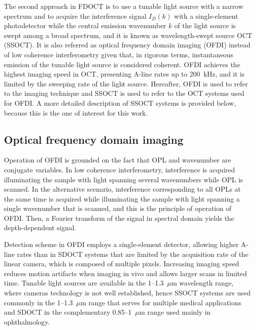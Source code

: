 The second approach in FDOCT is to use a tunable light source with a narrow spectrum and to acquire the interference signal $I_D(k)$ with a single-element photodetector while the central emission wavenumber $k$ of the light source is swept among a broad spectrum, and it is known as wavelength-swept source OCT (SSOCT). It is also referred as optical frequency domain imaging (OFDI) instead of low coherence interferometry given that, in rigorous terms, instantaneous emission of the tunable light source is considered coherent. OFDI achieves the highest imaging speed in OCT, presenting A-line rates up to 200~kHz, and it is limited by the sweeping rate of the light source. Hereafter, OFDI is used to refer to the imaging technique and SSOCT is used to refer to the OCT systems used for OFDI. A more detailed description of SSOCT systems is provided below, because this is the one of interest for this work.

\subsection{Optical frequency domain imaging}

Operation of OFDI is grounded on the fact that OPL and wavenumber are conjugate variables. In low coherence interferometry, interference is acquired illuminating the sample with light spanning several wavenumbers while OPL is scanned. In the alternative scenario, interference corresponding to all OPLs at the same time is acquired while illuminating the sample with light spanning a single wavenumber that is scanned, and this is the principle of operation of OFDI. Then, a Fourier transform of the signal in spectral domain yields the depth-dependent signal.

Detection scheme in OFDI employs a single-element detector, allowing higher A-line rates than in SDOCT systems that are limited by the acquisition rate of the linear camera, which is composed of multiple pixels. Increasing imaging speed reduces motion artifacts when imaging in vivo and allows larger scans in limited time. Tunable light sources are available in the 1--1.3~$\mu$m wavelength range, where cameras technology is not well established, hence SSOCT systems are used commonly in the 1--1.3~$\mu$m range that serves for multiple medical applications and SDOCT in the complementary 0.85--1~$\mu$m range used mainly in ophthalmology.

